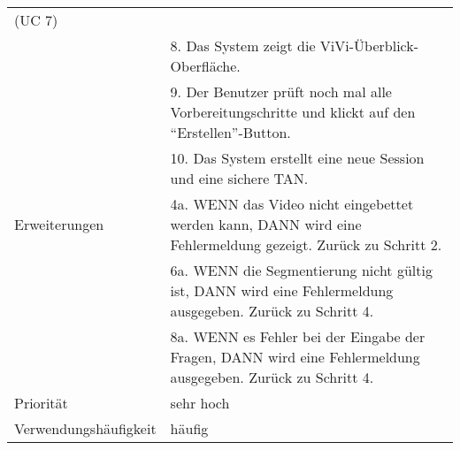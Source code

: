 \begin{tabularx}{\linewidth}{|l|X|}
							  (UC 7) \\
							& 8. Das System zeigt die ViVi-Überblick-Oberfläche. \\ 
							& 9. Der Benutzer prüft noch mal alle Vorbereitungschritte und 
							  klickt auf den ``Erstellen''-Button. \\
							& 10. Das System erstellt eine neue Session und eine sichere TAN. \\ 
							  \hline
	Erweiterungen			& 4a. WENN das Video nicht eingebettet werden kann, DANN wird eine 
	                          Fehlermeldung gezeigt. Zurück zu Schritt 2. \\
							& 6a. WENN die Segmentierung nicht gültig ist, DANN wird eine 
							  Fehlermeldung ausgegeben. Zurück zu Schritt 4.\\
							& 8a. WENN es Fehler bei der Eingabe der Fragen, DANN wird 
							  eine Fehlermeldung ausgegeben. Zurück zu Schritt 4. \\ \hline
	Priorität				& sehr hoch \\ \hline
	Verwendungshäufigkeit	& häufig \\ \hline
\end{tabularx}
